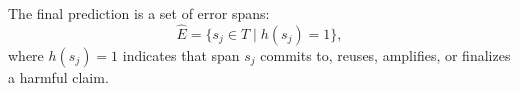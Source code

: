 The final prediction is a set of error spans:
\begin{equation}
    \hat{E}=\{s_j \in T \mid h(s_j)=1\},
    \label{eq:final-prediction}
\end{equation}
where $h(s_j)=1$ indicates that span $s_j$ commits to, reuses, amplifies, or finalizes a harmful claim.






